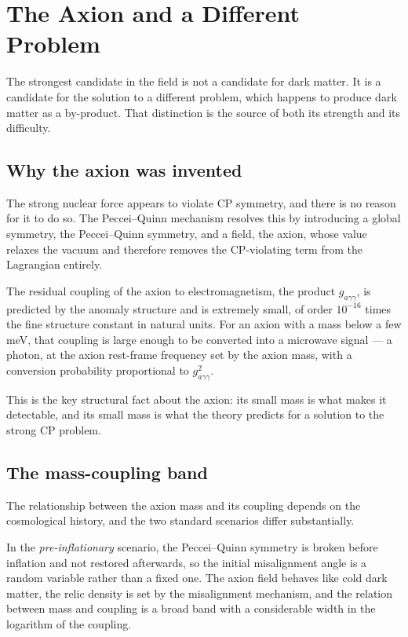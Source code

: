 
\chapter{The Axion and a Different Problem}
\label{ch:axion}

The strongest candidate in the field is not a candidate for dark matter. It
is a candidate for the solution to a different problem, which happens to
produce dark matter as a by-product. That distinction is the source of both
its strength and its difficulty.

\section{Why the axion was invented}The strong nuclear force appears to violate CP
symmetry, and there is no reason for it to do so. The Peccei--Quinn
mechanism resolves this by introducing a global symmetry, the Peccei--Quinn
symmetry, and a field, the axion, whose value relaxes the vacuum and
therefore removes the CP-violating term from the Lagrangian entirely.

The residual coupling of the axion to electromagnetism, the product
$g_{a\gamma\gamma}$, is predicted by the anomaly structure and is extremely
small, of order $10^{-16}$ times the fine structure constant in natural
units. For an axion with a mass below a few meV, that coupling is large
enough to be converted into a microwave signal --- a photon, at the axion
rest-frame frequency set by the axion mass, with a conversion probability
proportional to $g_{a\gamma\gamma}^2$.

This is the key structural fact about the axion: its small mass is what makes
it detectable, and its small mass is what the theory predicts for a solution
to the strong CP problem.

\section{The mass-coupling band}The relationship between the axion mass and its coupling
depends on the cosmological history, and the two standard scenarios differ
substantially.

In the \emph{pre-inflationary} scenario, the Peccei--Quinn symmetry is broken
before inflation and not restored afterwards, so the initial misalignment
angle is a random variable rather than a fixed one. The axion field behaves
like cold dark matter, the relic density is set by the misalignment mechanism,
and the relation between mass and coupling is a broad band with a
considerable width in the logarithm of the coupling.

